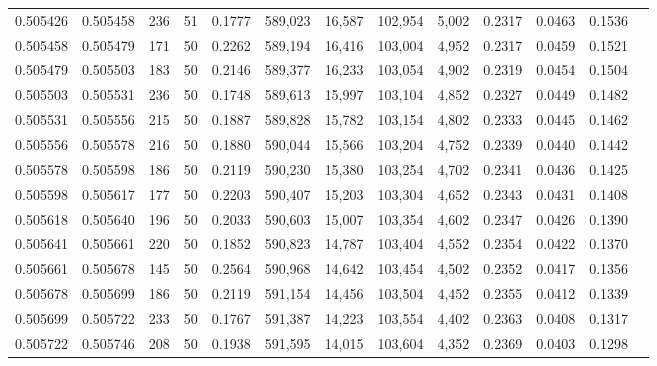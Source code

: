 \begin{tabular}{rrrrrrrrrrrrr}
0.505426 & 0.505458 & 236 &  51 &                                     0.1777 & 589,023 &  16,587 & 102,954 &   5,002 & 0.2317 & 0.0463 & 0.1536 \\
0.505458 & 0.505479 & 171 &  50 &                                     0.2262 & 589,194 &  16,416 & 103,004 &   4,952 & 0.2317 & 0.0459 & 0.1521 \\
0.505479 & 0.505503 & 183 &  50 &                                     0.2146 & 589,377 &  16,233 & 103,054 &   4,902 & 0.2319 & 0.0454 & 0.1504 \\
0.505503 & 0.505531 & 236 &  50 &                                     0.1748 & 589,613 &  15,997 & 103,104 &   4,852 & 0.2327 & 0.0449 & 0.1482 \\
0.505531 & 0.505556 & 215 &  50 &                                     0.1887 & 589,828 &  15,782 & 103,154 &   4,802 & 0.2333 & 0.0445 & 0.1462 \\
0.505556 & 0.505578 & 216 &  50 &                                     0.1880 & 590,044 &  15,566 & 103,204 &   4,752 & 0.2339 & 0.0440 & 0.1442 \\
0.505578 & 0.505598 & 186 &  50 &                                     0.2119 & 590,230 &  15,380 & 103,254 &   4,702 & 0.2341 & 0.0436 & 0.1425 \\
0.505598 & 0.505617 & 177 &  50 &                                     0.2203 & 590,407 &  15,203 & 103,304 &   4,652 & 0.2343 & 0.0431 & 0.1408 \\
0.505618 & 0.505640 & 196 &  50 &                                     0.2033 & 590,603 &  15,007 & 103,354 &   4,602 & 0.2347 & 0.0426 & 0.1390 \\
0.505641 & 0.505661 & 220 &  50 &                                     0.1852 & 590,823 &  14,787 & 103,404 &   4,552 & 0.2354 & 0.0422 & 0.1370 \\
0.505661 & 0.505678 & 145 &  50 &                                     0.2564 & 590,968 &  14,642 & 103,454 &   4,502 & 0.2352 & 0.0417 & 0.1356 \\
0.505678 & 0.505699 & 186 &  50 &                                     0.2119 & 591,154 &  14,456 & 103,504 &   4,452 & 0.2355 & 0.0412 & 0.1339 \\
0.505699 & 0.505722 & 233 &  50 &                                     0.1767 & 591,387 &  14,223 & 103,554 &   4,402 & 0.2363 & 0.0408 & 0.1317 \\
0.505722 & 0.505746 & 208 &  50 &                                     0.1938 & 591,595 &  14,015 & 103,604 &   4,352 & 0.2369 & 0.0403 & 0.1298 \\

\end{tabular}
